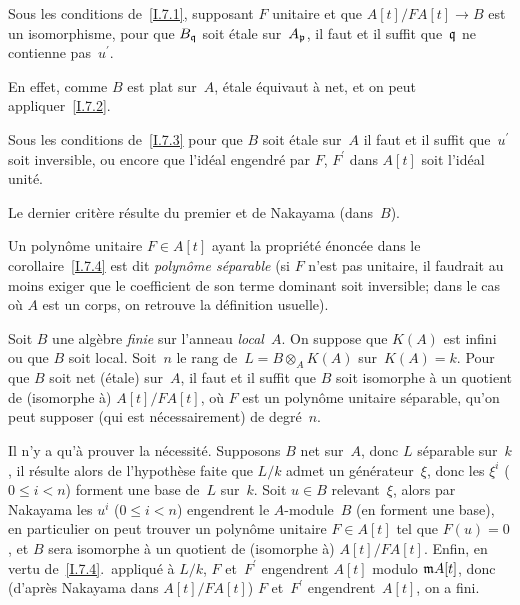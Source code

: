 \begin{corollaire}
\label{I.7.3}
Sous les conditions de~\ref{I.7.1}, supposant $F$ unitaire et que
$A[t]/FA[t] \to B$ est un isomorphisme, pour que $B_\mathfrak{q}$ soit
\'etale sur~$A_\mathfrak{p}$, il
faut et il suffit
que~$\mathfrak{q}$ ne contienne
pas~$u^\prime$.
\end{corollaire}

En effet, comme $B$ est plat sur~$A$, \'etale \'equivaut \`a
net, et on peut appliquer~\ref{I.7.2}.

\begin{corollaire}
\label{I.7.4}
Sous les conditions de~\ref{I.7.3} pour que $B$ soit \'etale
sur~$A$ il
faut et il suffit que~$u^\prime$ soit inversible, ou encore que l'id\'eal engendr\'e
par $F$, $F^\prime$ dans $A[t]$ soit l'id\'eal unit\'e.
\end{corollaire}

Le dernier crit\`ere r\'esulte du premier et de Nakayama
(dans~$B$).

Un polyn\^ome unitaire $F\in A[t]$ ayant la propri\'et\'e
\'enonc\'ee dans le corollaire~\ref{I.7.4}
est dit \emph{polynôme séparable}
(si $F$ n'est pas unitaire, il faudrait au moins exiger que le
coefficient de son terme dominant soit inversible; dans le cas o\`u
$A$ est un corps, on retrouve la d\'efinition usuelle).


\begin{corollaire}
\label{I.7.5}
Soit $B$ une alg\`ebre \emph{finie} sur l'anneau
\emph{local}~$A$. On suppose que $K(A)$ est infini ou que $B$ soit
local. Soit~$n$ le rang de~$L = B \otimes_A K(A)$ sur~$K(A) = k$. Pour
que $B$ soit net (\resp \'etale) sur~$A$, il faut et il suffit que
$B$ soit isomorphe \`a un quotient de (\resp isomorphe \`a)
$A[t]/FA[t]$, o\`u $F$ est un polyn\^ome unitaire s\'eparable,
qu'on peut supposer (\resp qui est n\'ecessairement) de
degr\'e~$n$.
\end{corollaire}

Il n'y a qu'\`a prouver la n\'ecessit\'e. Supposons $B$ net
sur~$A$, donc $L$ s\'eparable sur~$k$, il r\'esulte alors de
l'hypoth\`ese faite que $L/k$ admet un g\'en\'erateur~$\xi$,
donc les $\xi^i$ ($0 \leq i < n$) forment une base de~$L$
sur~$k$. Soit $u\in B$ relevant~$\xi$, alors par Nakayama les $u^i$
($0\leq i < n$) engendrent le $A$-module~$B$ (\resp en forment une
base), en particulier on peut trouver un polyn\^ome unitaire $F \in
A[t]$ tel que $F(u)= 0$, et $B$ sera isomorphe \`a un quotient de
(\resp isomorphe \`a) $A[t]/FA[t]$. Enfin, en vertu
de~\ref{I.7.4}.\ appliqu\'e \`a $L/k$, $F$ et~$F^\prime$
engendrent $A[t]$
modulo
$\mathfrak{m} A[t]$, donc (d'apr\`es Nakayama dans $A[t]/FA[t]$) $F$
et~$F^\prime$ engendrent~$A[t]$, on a fini.

